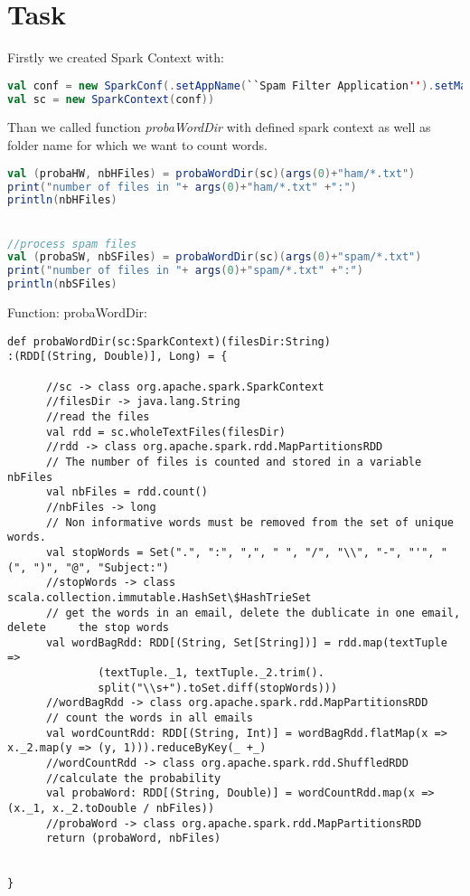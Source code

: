 \documentclass[paper=a4, fontsize=11pt]{scrartcl}
\numberwithin{equation}{section}		%
\numberwithin{figure}{section}			%
\numberwithin{table}{section}				%
\begin{document}
\section{Task}
Firstly we created Spark Context with:
\begin{lstlisting}[language=scala]
val conf = new SparkConf(.setAppName(``Spam Filter Application'').setMaster(``local'')
val sc = new SparkContext(conf))
\end{lstlisting}
Than we called function \textit{probaWordDir} with defined spark context as well as folder name for which we want to count words.
\begin{lstlisting}[language=scala]
val (probaHW, nbHFiles) = probaWordDir(sc)(args(0)+"ham/*.txt")
print("number of files in "+ args(0)+"ham/*.txt" +":")
println(nbHFiles)


//process spam files
val (probaSW, nbSFiles) = probaWordDir(sc)(args(0)+"spam/*.txt")
print("number of files in "+ args(0)+"spam/*.txt" +":")
println(nbSFiles)
\end{lstlisting}

Function: probaWordDir:
\begin{lstlisting}
def probaWordDir(sc:SparkContext)(filesDir:String)
:(RDD[(String, Double)], Long) = {

      //sc -> class org.apache.spark.SparkContext
      //filesDir -> java.lang.String
      //read the files
      val rdd = sc.wholeTextFiles(filesDir)
      //rdd -> class org.apache.spark.rdd.MapPartitionsRDD
      // The number of files is counted and stored in a variable nbFiles
      val nbFiles = rdd.count()
      //nbFiles -> long
      // Non informative words must be removed from the set of unique words.
      val stopWords = Set(".", ":", ",", " ", "/", "\\", "-", "'", "(", ")", "@", "Subject:")
      //stopWords -> class scala.collection.immutable.HashSet\$HashTrieSet
      // get the words in an email, delete the dublicate in one email, delete     the stop words
      val wordBagRdd: RDD[(String, Set[String])] = rdd.map(textTuple =>
              (textTuple._1, textTuple._2.trim().
              split("\\s+").toSet.diff(stopWords)))
      //wordBagRdd -> class org.apache.spark.rdd.MapPartitionsRDD
      // count the words in all emails
      val wordCountRdd: RDD[(String, Int)] = wordBagRdd.flatMap(x => x._2.map(y => (y, 1))).reduceByKey(_ +_)
      //wordCountRdd -> class org.apache.spark.rdd.ShuffledRDD
      //calculate the probability
      val probaWord: RDD[(String, Double)] = wordCountRdd.map(x => (x._1, x._2.toDouble / nbFiles))
      //probaWord -> class org.apache.spark.rdd.MapPartitionsRDD
      return (probaWord, nbFiles)


}
\end{lstlisting}
\end{document}
